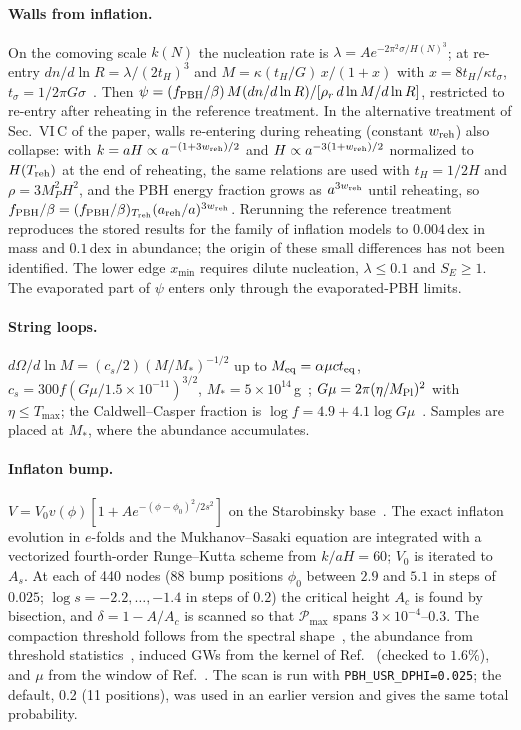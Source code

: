 \documentclass[aps,prd,onecolumn,superscriptaddress,nofootinbib,floatfix]{revtex4-2}
\newcommand{\fpbh}{f_{\rm PBH}}
\newcommand{\Treh}{T_{\rm reh}}
\newcommand{\wreh}{w_{\rm reh}}
\newcommand{\code}[1]{\texttt{#1}}
\begin{document}
\paragraph*{Walls from inflation.}
On the comoving scale $k(N)$ the nucleation rate is $\lambda=Ae^{-2\pi^2\sigma/H(N)^3}$; at re-entry $dn/d\ln R=\lambda/(2t_H)^3$ and $M=\kappa(t_H/G)\,x/(1+x)$ with $x=8t_H/\kappa t_\sigma$, $t_\sigma=1/2\pi G\sigma$~\cite{Deng:2016vzb}. Then $\psi=(\fpbh/\beta)\,M(dn/d\ln R)/[\rho_r\,d\ln M/d\ln R]$, restricted to re-entry after reheating in the reference treatment. In the alternative treatment of Sec.~VI\,C of the paper, walls re-entering during reheating (constant $\wreh$) also collapse: with $k=aH\propto a^{-(1+3\wreh)/2}$ and $H\propto a^{-3(1+\wreh)/2}$ normalized to $H(\Treh)$ at the end of reheating, the same relations are used with $t_H=1/2H$ and $\rho=3M_P^2H^2$, and the PBH energy fraction grows as $a^{3\wreh}$ until reheating, so $\fpbh/\beta=(\fpbh/\beta)_{\Treh}(a_{\rm reh}/a)^{3\wreh}$. Rerunning the reference treatment reproduces the stored results for the family of inflation models to $0.004$\,dex in mass and $0.1$\,dex in abundance; the origin of these small differences has not been identified. The lower edge $x_{\min}$ requires dilute nucleation, $\lambda\le0.1$ and $S_E\ge1$. The evaporated part of $\psi$ enters only through the evaporated-PBH limits.

\paragraph*{String loops.}
$d\Omega/d\ln M=(c_s/2)(M/M_\ast)^{-1/2}$ up to $M_{\rm eq}=\alpha\mu ct_{\rm eq}$, $c_s=300f(G\mu/1.5\times10^{-11})^{3/2}$, $M_\ast=5\times10^{14}$\,g~\cite{James-Turner:2019ssu}; $G\mu=2\pi(\eta/M_{\rm Pl})^2$ with $\eta\le T_{\max}$; the Caldwell--Casper fraction is $\log f=4.9+4.1\log G\mu$~\cite{Caldwell:1995fu}. Samples are placed at $M_\ast$, where the abundance accumulates.

\paragraph*{Inflaton bump.}
$V=V_0v(\phi)[1+Ae^{-(\phi-\phi_0)^2/2s^2}]$ on the Starobinsky base~\cite{Mishra:2019pzq}. The exact inflaton evolution in $e$-folds and the Mukhanov--Sasaki equation are integrated with a vectorized fourth-order Runge--Kutta scheme from $k/aH=60$; $V_0$ is iterated to $A_s$. At each of 440 nodes (88 bump positions $\phi_0$ between $2.9$ and $5.1$ in steps of $0.025$; $\log s=-2.2,\dots,-1.4$ in steps of $0.2$) the critical height $A_c$ is found by bisection, and $\delta=1-A/A_c$ is scanned so that $\mathcal{P}_{\max}$ spans $3\times10^{-4}$--$0.3$. The compaction threshold follows from the spectral shape~\cite{Musco:2020jjb}, the abundance from threshold statistics~\cite{Ferrante:2022mui}, induced GWs from the kernel of Ref.~\cite{Kohri:2018awv} (checked to $1.6\%$), and $\mu$ from the window of Ref.~\cite{Chluba:2012we}. The scan is run with \code{PBH\_USR\_DPHI=0.025}; the default, 0.2 (11 positions), was used in an earlier version and gives the same total probability.
\end{document}
